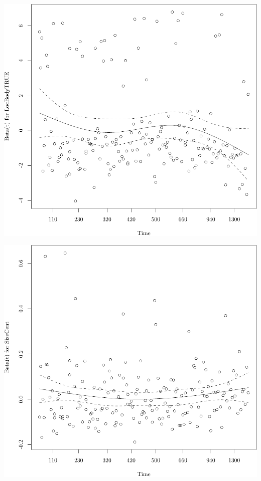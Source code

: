 \documentclass{article}\usepackage[]{graphicx}\usepackage[]{color}
\makeatletter
\def\maxwidth{ %
  \ifdim\Gin@nat@width>\linewidth
    \linewidth
  \else
    \Gin@nat@width
  \fi
}
\newenvironment{knitrout}{}{} %
\makeatother
\begin{document}
\begin{knitrout}
{}




{\centering \includegraphics[width=\maxwidth]{figure/05-eda-ph-check-full-4} 

}




{\centering \includegraphics[width=\maxwidth]{figure/05-eda-ph-check-full-5} 

}
\end{knitrout}
\end{document}
